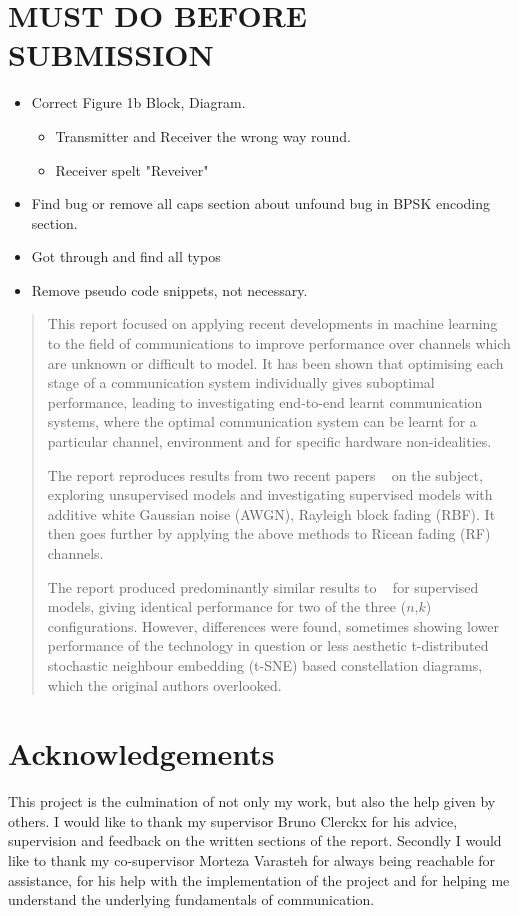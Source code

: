 \documentclass[12pt,onecolumn,letterpaper]{article}
\begin{document}
\section*{MUST DO BEFORE SUBMISSION}

\begin{itemize}
   \item Correct Figure 1b Block, Diagram.
   \begin{itemize}
      \item Transmitter and Receiver the wrong way round.
      \item Receiver spelt "Reveiver"
   \end{itemize} 
   \item Find bug or remove all caps section about unfound bug in BPSK encoding section.
   \item Got through and find all typos
   \item Remove pseudo code snippets, not necessary.
\end{itemize}


\begin{abstract}   
   This report focused on applying recent developments in machine learning to the field of communications to improve performance over channels which are unknown or difficult to model. It has been shown that optimising each stage of a communication system individually gives suboptimal performance, leading to investigating end-to-end learnt communication systems, where the optimal communication system can be learnt for a particular channel, environment and for specific hardware non-idealities.
   
   The report reproduces results from two recent papers ~\cite{oShea,Aoudia} on the subject, exploring unsupervised models and investigating supervised models with additive white Gaussian noise (AWGN), Rayleigh block fading (RBF). It then goes further by applying the above methods to Ricean fading (RF) channels.
   
   The report produced predominantly similar results to ~\cite{oShea} for supervised models, giving identical performance for two of the three ($n$,$k$) configurations. However, differences were found, sometimes showing lower performance of the technology in question or less aesthetic t-distributed stochastic neighbour embedding (t-SNE) based constellation diagrams, which the original authors overlooked.
\end{abstract}
\pagebreak

\section*{Acknowledgements}
This project is the culmination of not only my work, but also the help given by others. I would like to thank my supervisor Bruno Clerckx for his advice, supervision and feedback on the written sections of the report. Secondly I would like to thank 
my co-supervisor Morteza Varasteh for always being reachable for assistance, for his help with the implementation of the project and for helping me understand the underlying fundamentals of communication.
\end{document}
